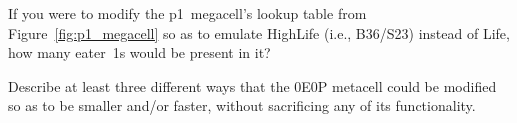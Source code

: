 \begin{multicols}{2}
	
	\begin{problem}\label{exer:modify_p1_megacell_rule} 
		If you were to modify the p1~megacell's lookup table from Figure~\ref{fig:p1_megacell} so as to emulate HighLife (i.e., B36/S23) instead of Life, how many eater~1s would be present in it?
	\end{problem}


	\mfilbreak
	
	
	\begin{problem}\label{exer:0e0p_how_make_faster} 
		Describe at least three different ways that the 0E0P metacell could be modified so as to be smaller and/or faster, without sacrificing any of its functionality.
	\end{problem}
	
	
\end{multicols}
\normalsize\vspace*{0.01cm}
